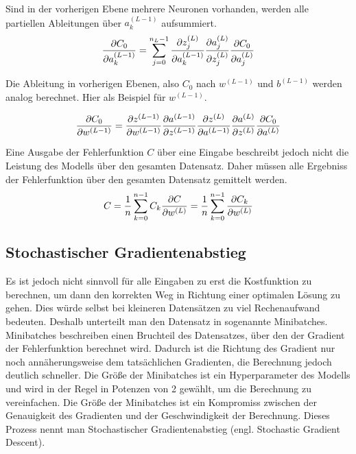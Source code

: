 Sind in der vorherigen Ebene mehrere Neuronen vorhanden, werden alle partiellen Ableitungen über $a_k^{(L-1)}$ aufsummiert.
\begin{equation}
    \frac{\partial C_0}{\partial a_k^{(L-1)}} = \sum_{j=0}^{n_L-1}\frac{\partial z_j^{(L)}}{\partial a_k^{(L-1)}}\frac{\partial a_j^{(L)}}{\partial z_j^{(L)}}\frac{\partial C_0}{\partial a_j^{(L)}}\\
\end{equation}

Die Ableitung in vorherigen Ebenen, also $C_0$ nach $w^{(L-1)}$ und $b^{(L-1)}$ werden analog berechnet. Hier als Beispiel für $w^{(L-1)}$.

\begin{equation}
    \frac{\partial C_0}{\partial w^{(L-1)}} = \frac{\partial z^{(L-1)}}{\partial w^{(L-1)}}\frac{\partial a^{(L-1)}}{\partial z^{(L-1)}}\frac{\partial z^{(L)}}{\partial a^{(L-1)}}\frac{\partial a^{(L)}}{\partial z^{(L)}}\frac{\partial C_0}{\partial a^{(L)}}\\
\end{equation}

Eine Ausgabe der Fehlerfunktion $C$ über eine Eingabe beschreibt jedoch nicht die Leistung des Modells über den gesamten Datensatz. Daher müssen alle Ergebniss der Fehlerfunktion über den gesamten Datensatz gemittelt werden. 
\begin{equation}
    C = \frac{1}{n}\sum_{k=0}^{n-1}C_k\\
    \frac{\partial C}{\partial w^{(L)}} = \frac{1}{n}\sum_{k=0}^{n-1}\frac{\partial C_k}{\partial w^{(L)}}	
\end{equation}
\subsection{Stochastischer Gradientenabstieg}
Es ist jedoch nicht sinnvoll für alle Eingaben zu erst die Kostfunktion zu berechnen, um dann den korrekten Weg in Richtung einer optimalen Lösung zu gehen.
Dies würde selbst bei kleineren Datensätzen zu viel Rechenaufwand bedeuten.
Deshalb unterteilt man den Datensatz in sogenannte Minibatches.
Minibatches beschreiben einen Bruchteil des Datensatzes, über den der Gradient der Fehlerfunktion berechnet wird.
Dadurch ist die Richtung des Gradient nur noch annäherungsweise dem tatsächlichen Gradienten, die Berechnung jedoch deutlich schneller.
Die Größe der Minibatches ist ein Hyperparameter des Modells und wird in der Regel in Potenzen von 2 gewählt, um die Berechnung zu vereinfachen.
Die Größe der Minibatches ist ein Kompromiss zwischen der Genauigkeit des Gradienten und der Geschwindigkeit der Berechnung.
Dieses Prozess nennt man Stochastischer Gradientenabstieg (engl. Stochastic Gradient Descent).

